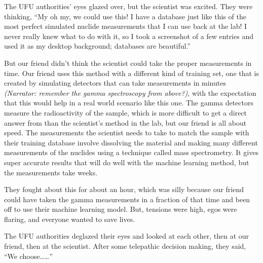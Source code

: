 {\begin{shadequote}
  The UFU authorities' eyes glazed over, but the scientist was excited. They
  were thinking, ``My oh my, we could use this! I have a database just like this
  of the most perfect simulated nuclide measurements that I can use back at the
  lab! I never really knew what to do with it, so I took a screenshot of a few
  entries and used it as my desktop background; databases are beautiful.''
  
  But our friend didn't think the scientist could take the proper measurements
  in time. Our friend uses this method with a different kind of training set,
  one that is created by simulating detectors that can take measurements in
  minutes \textit{(Narrator: remember the gamma spectroscopy from above?)},
  with the expectation that this would help in a real world scenario like this
  one. The gamma detectors measure the radioactivity of the sample, which is
  more difficult to get a direct answer from than the scientist's method in the
  lab, but our friend is all about speed. The measurements the scientist needs
  to take to match the sample with their training database involve dissolving
  the material and making many different measurements of the nuclides using a
  technique called mass spectrometry\footnotemark[7].  It gives super accurate
  results that will do well with the machine learning method, but the
  measurements take weeks. 
  
  They fought about this for about an hour, which was silly because our friend
  could have taken the gamma measurements in a fraction of that time and been
  off to use their machine learning model. But, tensions were high, egos were
  flaring, and everyone wanted to save lives. 
  
  The UFU authorities deglazed their eyes and looked at each other, then at our
  friend, then at the scientist. After some telepathic decision making, they
  said, ``We choose\ldots\ldots''

\end{shadequote}

}
